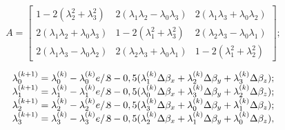 \[A=\left[ \begin{array}{ccc} 
{1-2(\lambda_{2}^{2} +\lambda_{3}^{2} )} & {2(\lambda_{1} \lambda_{2}-\lambda_{0} \lambda_{3})} & {2(\lambda_{1} \lambda_{3} +\lambda_{0}\lambda_{2} )} \\ 
{2(\lambda_{1} \lambda_{2} +\lambda_{0} \lambda_{3} )} & {1-2(\lambda_{1}^{2} +\lambda_{3}^{2} )} & {2(\lambda_{2} \lambda_{3} -\lambda_{0}\lambda_{1})} \\ 
{2(\lambda_{1} \lambda_{3} -\lambda_{0} \lambda_{2} )} & {2(\lambda_{2} \lambda_{3} +\lambda_{0} \lambda_{1} )} & {1-2(\lambda_{1}^{2} +\lambda_{2}^{2})} 
\end{array}  \right];\]


\begin{equation}
\label{eq:qcalc} 
\begin{array}{cccc} 
{\lambda_{0}^{(k+1)}=\lambda_{0}^{(k)} -\lambda_{0}^{(k)} {e \mathord{/{\vphantom{e 8}}.\kern-\nulldelimiterspace} 8} 
-0,5(\lambda_{1}^{(k)} \Delta \beta_{x} +\lambda_{2}^{(k)} \Delta \beta_{y} +\lambda_{3}^{(k)} \Delta \beta_{z});}\\ 
{\lambda_{1}^{(k+1)} =\lambda_{1}^{(k)} -\lambda_{1}^{(k)} {e \mathord{/{\vphantom{e 8}}.\kern-\nulldelimiterspace} 8}
-0,5(\lambda_{0}^{(k)}\Delta \beta_{x} +\lambda_{3}^{(k)} \Delta \beta_{y} +\lambda_{2}^{(k)} \Delta\beta_{z});} \\ 
{\lambda_{2}^{(k+1)} =\lambda_{2}^{(k)} -\lambda_{2}^{(k)} {e \mathord{/{\vphantom{e 8}}.\kern-\nulldelimiterspace} 8} 
-0,5(\lambda_{3}^{(k)} \Delta \beta_{x} +\lambda_{0}^{(k)} \Delta \beta_{y}+\lambda_{1}^{(k)} \Delta \beta_{z} )  ;} \\ 
{\lambda_{3}^{(k+1)} =\lambda_{3}^{(k)} -\lambda_{3}^{(k)} {e \mathord{/{\vphantom{e 8}}.\kern-\nulldelimiterspace} 8} 
-0,5(\lambda_{2}^{(k)} \Delta \beta_{x} +\lambda_{1}^{(k)} \Delta \beta_{y} +\lambda_{0}^{(k)} \Delta \beta_{z} )  ,} 
\end{array} 
\end{equation}

